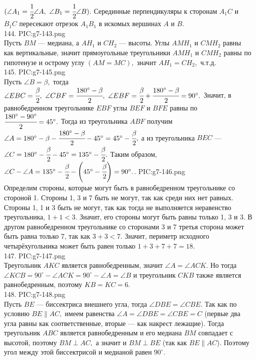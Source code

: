 $(\angle A_1 = \cfrac{1}{2}\angle A,\ \angle B_1 =\cfrac{1}{2}\angle B).$  Серединные перпендикуляры к сторонам $A_1C$ и $B_1C$ пересекают отрезок $A_1B_1$ в искомых вершинах $A$ и $B.$\\
144. {{PIC:g7-143.png}}\\
Пусть $BM$ --- медиана, а $AH_1$ и $CH_2$ --- высоты. Углы $AMH_1$ и $CMH_2$ равны как вертикальные, значит прямоугольные треугольники $AMH_1$ и $CMH_2$ равны по гипотенузе и острому углу $(AM=MC),$ значит $AH_1=CH_2,$ ч.т.д.\\
145. {{PIC:g7-145.png}}\\
Пусть $\angle B=\beta,$ тогда $\angle EBC=\cfrac{\beta}{2},\ \angle CBF=\cfrac{180^\circ-\beta}{2},\ \angle EBF=\cfrac{\beta}{2}+\cfrac{180^\circ-\beta}{2}=90^\circ.$ Значит, в равнобедренном треугольнике $EBF$ углы $BEF$ и $BFE$ равны по $\cfrac{180^\circ-90^\circ}{2}=45^\circ.$ Тогда из треугольника $ABF$ получим $\angle A=180^\circ-\beta-\cfrac{180^\circ-\beta}{2}-45^\circ=45^\circ-\cfrac{\beta}{2},$ а из треугольника $BEC$ --- $\angle C=180^\circ-\cfrac{\beta}{2}-45^\circ=135^\circ-\cfrac{\beta}{2}.$ Таким образом, $\angle C-\angle A=135^\circ-\cfrac{\beta}{2} -\left(45^\circ-\cfrac{\beta}{2}\right)=90^\circ.$\newpage{}. {{PIC:g7-146.png}}\\
Определим стороны, которые могут быть в равнобедренном треугольнике со стороной 1. Стороны 1, 3 и 7 быть не могут, так как среди них нет равных. Стороны 1, 1 и 3 быть не могут, так как тогда не выполняется неравенство треугольника,  $1+1<3.$ Значит, его стороны могут быть равны только 1, 3 и 3. В другом равнобедренном треугольнике со сторонами 3 и 7 третья сторона может быть равна только 7, так как $3+3<7.$ Значит, периметр исходного четырёхугольника может быть равен только $1+3+7+7=18.$\\
147. {{PIC:g7-147.png}}\\
Треугольник $AKC$ является равнобедренным, значит $\angle A=\angle ACK.$ Но тогда $\angle KCB=90^\circ-\angle ACK=90^\circ-\angle A=\angle B$ и треугольник $CKB$ также является равнобедренным, поэтому $KB=KC=6.$\\
148. {{PIC:g7-148.png}}\\
Пусть $BE$ --- биссектриса внешнего угла, тогда $\angle DBE=\angle CBE.$ Так как по условию $BE\parallel AC,$ имеем равенства $\angle A=\angle DBE=\angle CBE=C$ (первые два угла равны как соответственные, вторые --- как накрест лежащие). Тогда треугольник $ABC$ является равнобедренным и его медиана $BM$ совпадает с высотой, поэтому $BM\perp AC,$ а значит и $BM\perp BE$ (так как $BE\parallel AC$). Поэтому угол между этой биссектрисой и медианой равен $90^\circ.$\newpage\noindent
